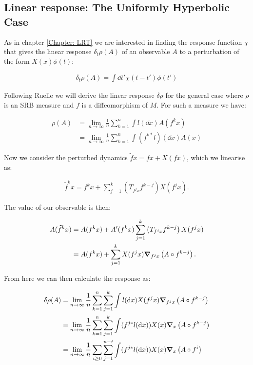 \subsection{Linear response: The Uniformly Hyperbolic Case}



As in chapter \ref{Chapter: LRT} we are interested in finding the response function $\chi$ that gives the linear response $\delta_t\rho (A)$ of an observable $A$ to a perturbation of the form $X(x)\phi(t)$:

\begin{align} \label{basic response}
\delta_t \rho(A) = \int \dd t' \chi(t - t') \phi (t')
\end{align}

\noindent Following Ruelle \cite{Ruelle} we will derive the linear response $\delta \rho$ for the general case where $\rho$ is an SRB measure and $f$ is a diffeomorphism of $M$. For such a measure we have:

\begin{align}
\rho(A) &= \lim_{n \to \infty} \frac{1}{n} \sum_{k=1} ^n \int l( \dd x) A (f^k x)\\
&= \lim_{n \to \infty} \frac{1}{n} \sum_{k=1} ^n \int (f^{k*}l)( \dd x) A (x)
\end{align}

\noindent Now we consider the perturbed dynamics $\tilde{f} x = f x + X(fx)$, which we linearise as:

\begin{align}
\tilde{f}^kx = f^k x + \sum_{j = 1}^k \left(T_{f^j x} f^{k - j} \right) X(f^j x).
\end{align}

\noindent The value of our observable is then:

\begin{align}
A(\tilde{f}^k x) &= A(f^k x) + A'(f^k x) \sum_{j = 1}^k \left(T_{f^j x} f^{k - j} \right) X(f^j x)\\
&= A(f^k x) + \sum_{j=1} ^k X(f^j x) \grad_{f^j x} \left(A \circ f ^{k -j} \right).
\end{align}

\noindent From here we can then calculate the response as:

\begin{align}
\delta \rho (A) &= \lim_{n \to \infty} \frac{1}{n} \sum_{k = 1}^n \sum_{j=1}^k \int l (\dd x) X(f^j x) \grad_{f^j x} \left(A \circ f ^{k -j} \right)\\
&= \lim_{n \to \infty} \frac{1}{n} \sum_{k = 1}^n \sum_{j=1}^k \int (f^{j*} l (\dd x )) X(x) \grad_{x} \left(A \circ f ^{k -j} \right)\\ 
&= \lim_{n \to \infty} \frac{1}{n} \sum_{i \geq 0} \sum_{j=1}^{n-i} \int (f^{j*} l (\dd x )) X(x) \grad_{x} \left(A \circ f ^i \right)
\end{align}

